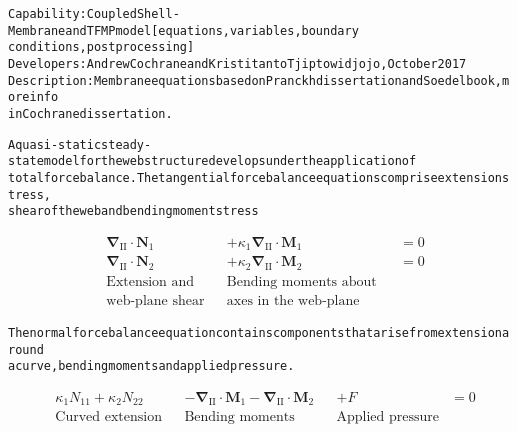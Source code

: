 \documentclass{article}
\begin{document}
\begin{alltt}
Capability: Coupled Shell-Membrane and TFMP model [equations, variables, boundary
conditions, post processing]
Developers: Andrew Cochrane and Kristitanto Tjiptowidjojo, October 2017
Description: Membrane equations based on Pranckh dissertation and Soedel book, more info
in Cochrane dissertation.

A quasi-static steady-state model for the web structure develops under the application of
total force balance. The tangential force balance equations comprise extension stress,
shear of the web and bending moment stress
\end{alltt}
\begin{subequations}
\begin{align*}
&\boldsymbol{\nabla}_\mathrm{II} \cdot \boldsymbol{N}_1& & + \kappa_1  \boldsymbol{\nabla}_\mathrm{II} \cdot \boldsymbol{M}_1& &= 0\\
&\boldsymbol{\nabla}_\mathrm{II} \cdot \boldsymbol{N}_2& & + \kappa_2  \boldsymbol{\nabla}_\mathrm{II} \cdot \boldsymbol{M}_2& &= 0\\
&\text{Extension and}&     &\text{Bending moments about}& \nonumber&\\
&\text{web-plane shear}&   &\text{axes in the web-plane}& \nonumber&
\end{align*}
\end{subequations}
\begin{alltt}
The normal force balance equation contains components that arise from extension around
a curve, bending moments and applied pressure.
\end{alltt}
\begin{align*}
&\kappa_1 N_{11} + \kappa_2 N_{22}&  & - \boldsymbol{\nabla}_\mathrm{II} \cdot \boldsymbol{M}_1 - \boldsymbol{\nabla}_\mathrm{II} \cdot \boldsymbol{M}_2&  &+ F& = 0 \label{eq:3dshell_normal_balance}\\
&\text{Curved extension}&         &\text{Bending moments}&        &\text{Applied pressure}& \nonumber
\end{align*}
\end{document}
